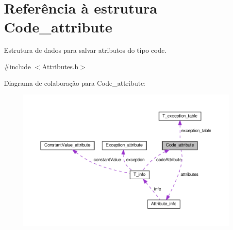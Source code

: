 \hypertarget{structCode__attribute}{}\section{Referência à estrutura Code\+\_\+attribute}
\label{structCode__attribute}


Estrutura de dados para salvar atributos do tipo code.  




{\ttfamily \#include $<$Attributes.\+h$>$}



Diagrama de colaboração para Code\+\_\+attribute\+:\nopagebreak
\begin{figure}[H]
\begin{center}
\leavevmode
\includegraphics[width=350pt]{structCode__attribute__coll__graph}
\end{center}
\end{figure}
